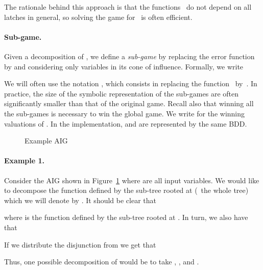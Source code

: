 \documentclass[submission,copyright,creativecommons]{eptcs}
\begin{document}
The rationale behind this approach is that the functions~ do not depend on
all latches in general, so solving the game for~ is often efficient.

\paragraph{Sub-game.}
Given a decomposition of , we define a \emph{sub-game}  by replacing
the error function by  and considering only variables in its cone of
influence. Formally, we write 

We will often use the notation
, which consists in replacing the function~
by~.  In practice, the size of the symbolic representation of the sub-games
are often significantly smaller than that of the original game. Recall also that
winning all the sub-games is necessary to win the global game.  We write
 for the winning valuations of .
In the implementation,  and  are represented by the same BDD.

\begin{figure}
\centering
{}
\caption{Example AIG}
\label{fig:example-aig-1}
\end{figure}

\paragraph{Example 1.} Consider the AIG shown in
Figure~\ref{fig:example-aig-1} where  are all input variables.
We would like to decompose the function defined by the sub-tree rooted at 
(\ie\ the whole tree) which we will denote by . It should be clear that

where  is the function defined by the sub-tree rooted at . In
turn, we also have that

If we distribute the disjunction from  we get that

Thus, one possible decomposition of  would be to take , , and .
\end{document}
